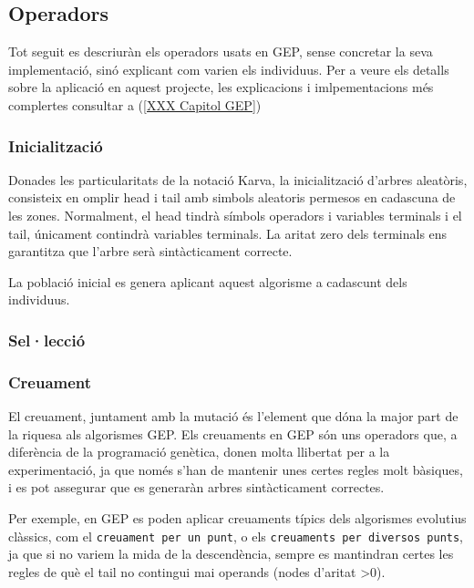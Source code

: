 \documentclass[titlepage,a4paper,12pt]{book}
\begin{document}
\subsection{Operadors} %
\label{sub:Operadors}

Tot seguit es descriuràn els operadors usats en GEP, sense concretar la seva
implementació, sinó explicant com varien els individuus.  Per a veure els
detalls sobre la aplicació en aquest projecte, les explicacions i
imlpementacions més complertes consultar a (\ref{XXX Capitol GEP})

\subsubsection{Inicialització} %
\label{ssub:Inicialitzacio}
Donades les particularitats de la notació Karva, la inicialització d'arbres
aleatòris, consisteix en omplir head i tail amb simbols aleatoris permesos en
cadascuna de les zones.  Normalment, el head tindrà símbols operadors i
variables terminals i el tail, únicament contindrà variables terminals.  La
aritat zero dels terminals ens garantitza que l'arbre serà sintàcticament
correcte.

La població inicial es genera aplicant aquest algorisme a cadascunt dels
individuus.

\subsubsection{Sel·lecció} %
\label{ssub:Seleccio}


\subsubsection{Creuament} %
\label{ssub:Creuament}

El creuament, juntament amb la mutació és l'element que dóna la major part de la
riquesa als algorismes GEP.  Els creuaments en GEP són uns operadors que, a
diferència de la programació genètica, donen molta llibertat per a la
experimentació, ja que només s'han de mantenir unes certes regles molt bàsiques,
i es pot assegurar que es generaràn arbres sintàcticament correctes.

Per exemple, en GEP es poden aplicar creuaments típics dels algorismes evolutius
clàssics, com el \texttt{creuament per un punt}, o els \texttt{creuaments per
diversos punts}, ja que si no variem la mida de la descendència, sempre es
mantindran certes les regles de què el tail no contingui mai operands (nodes
d'aritat >0).
\end{document}
